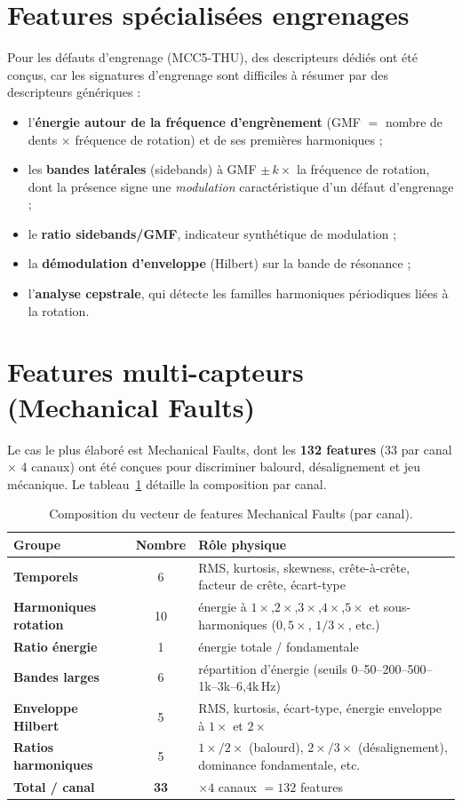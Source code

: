 \section{Features spécialisées engrenages}
Pour les défauts d'engrenage (MCC5-THU), des descripteurs dédiés ont été conçus, car les
signatures d'engrenage sont difficiles à résumer par des descripteurs génériques :
\begin{itemize}[leftmargin=1.5em]
  \item l'\textbf{énergie autour de la fréquence d'engrènement} (GMF $=$ nombre de dents
        $\times$ fréquence de rotation) et de ses premières harmoniques ;
  \item les \textbf{bandes latérales} (sidebands) à GMF $\pm\,k\!\times$ la fréquence de
        rotation, dont la présence signe une \emph{modulation} caractéristique d'un défaut
        d'engrenage ;
  \item le \textbf{ratio sidebands/GMF}, indicateur synthétique de modulation ;
  \item la \textbf{démodulation d'enveloppe} (Hilbert) sur la bande de résonance ;
  \item l'\textbf{analyse cepstrale}, qui détecte les familles harmoniques périodiques liées
        à la rotation.
\end{itemize}

\section{Features multi-capteurs (Mechanical Faults)}
Le cas le plus élaboré est Mechanical Faults, dont les \textbf{132 features} (33 par canal
$\times$ 4 canaux) ont été conçues pour discriminer balourd, désalignement et jeu mécanique.
Le tableau~\ref{tab:mffeat} détaille la composition par canal.

\begin{table}[h]
\centering\small
\caption{Composition du vecteur de features Mechanical Faults (par canal).}
\label{tab:mffeat}
\begin{tabular}{>{\bfseries}l c p{7.2cm}}
\toprule
Groupe & Nombre & Rôle physique \\
\midrule
Temporels & 6 & RMS, kurtosis, skewness, crête-à-crête, facteur de crête, écart-type \\
Harmoniques rotation & 10 & énergie à $1\times$,$2\times$,$3\times$,$4\times$,$5\times$ et sous-harmoniques ($0{,}5\times$, $1/3\times$, etc.) \\
Ratio énergie & 1 & énergie totale / fondamentale \\
Bandes larges & 6 & répartition d'énergie (seuils 0--50--200--500--1k--3k--6{,}4k\,Hz) \\
Enveloppe Hilbert & 5 & RMS, kurtosis, écart-type, énergie enveloppe à $1\times$ et $2\times$ \\
Ratios harmoniques & 5 & $1\times/2\times$ (balourd), $2\times/3\times$ (désalignement), dominance fondamentale, etc. \\
\midrule
\textbf{Total / canal} & \textbf{33} & $\times 4$ canaux $= 132$ features \\
\bottomrule
\end{tabular}
\end{table}


